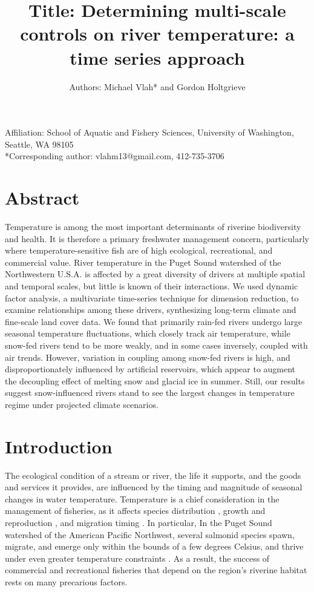 \documentclass[notitlepage]{article}
\author{Authors: Michael Vlah* and Gordon Holtgrieve}
\title{Title: Determining multi-scale controls on river temperature: a time series approach}
\begin{document}

\maketitle
\noindent
Affiliation: School of  Aquatic and Fishery Sciences, University of Washington, Seattle, WA 98105
\\[\baselineskip]
\noindent
*Corresponding author: vlahm13@gmail.com, 412-735-3706
\clearpage


\section*{Abstract}
Temperature is among the most important determinants of riverine biodiversity and health. It is therefore a primary freshwater management concern, particularly where temperature-sensitive fish are of high ecological, recreational, and commercial value. River temperature in the Puget Sound watershed of the Northwestern U.S.A. is affected by a great diversity of drivers at multiple spatial and temporal scales, but little is known of their interactions. We used dynamic factor analysis, a multivariate time-series technique for dimension reduction, to examine relationships among these drivers, synthesizing long-term climate and fine-scale land cover data. We found that primarily rain-fed rivers undergo large seasonal temperature fluctuations, which closely track air temperature, while snow-fed rivers tend to be more weakly, and in some cases inversely, coupled with air trends. However, variation in coupling among snow-fed rivers is high, and disproportionately influenced by artificial reservoirs, which appear to augment the decoupling effect of melting snow and glacial ice in summer. Still, our results suggest snow-influenced rivers stand to see the largest changes in temperature regime under projected climate scenarios.

\clearpage

\section*{Introduction}

The ecological condition of a stream or river, the life it supports, and the goods and services it provides, are influenced by the timing and magnitude of seasonal changes in water temperature. Temperature is a chief consideration in the management of fisheries, as it affects species distribution \citep{Boisneau2008}, growth and reproduction \citep{mccullough1999review}, and migration timing \citep{boscarino2007effects}. In particular, In the Puget Sound watershed of the American Pacific Northwest, several salmonid species spawn, migrate, and emerge only within the bounds of a few degrees Celsius, and thrive under even greater temperature constraints \citep{carter2005effects}. As a result, the success of commercial and recreational fisheries that depend on the region's riverine habitat rests on many precarious factors.
\end{document}
